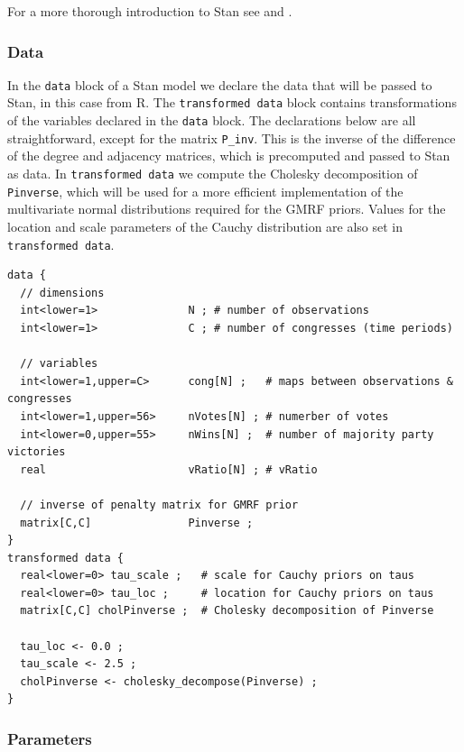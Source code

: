 For a more thorough introduction to Stan see  and . 

\subsubsection{Data}

In the {\tt data} block of a Stan model we declare the data that will be passed to Stan, in this case from R. The {\tt transformed data} block contains transformations of the variables declared in the {\tt data} block. The declarations below are all straightforward, except for the matrix {\tt P\_inv}. This is the inverse of the difference of the degree and adjacency matrices, which is precomputed and passed to Stan as data. In {\tt transformed data} we compute the Cholesky decomposition of {\tt Pinverse}, which will be used for a more efficient implementation of the multivariate normal distributions required for the GMRF priors. Values for the location and scale parameters of the Cauchy distribution are also set in {\tt transformed data}. 


\begin{singlespacing}
\small 
\begin{verbatim}
data {
  // dimensions
  int<lower=1>              N ; # number of observations
  int<lower=1>              C ; # number of congresses (time periods)

  // variables
  int<lower=1,upper=C>      cong[N] ;   # maps between observations & congresses
  int<lower=1,upper=56>     nVotes[N] ; # numerber of votes
  int<lower=0,upper=55>     nWins[N] ;  # number of majority party victories
  real                      vRatio[N] ; # vRatio

  // inverse of penalty matrix for GMRF prior
  matrix[C,C]               Pinverse ;
}
transformed data {
  real<lower=0> tau_scale ;   # scale for Cauchy priors on taus
  real<lower=0> tau_loc ;     # location for Cauchy priors on taus
  matrix[C,C] cholPinverse ;  # Cholesky decomposition of Pinverse

  tau_loc <- 0.0 ;
  tau_scale <- 2.5 ;
  cholPinverse <- cholesky_decompose(Pinverse) ;
}
\end{verbatim}
\end{singlespacing}


\subsubsection{Parameters}


